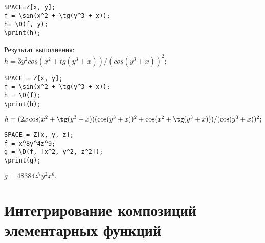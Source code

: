 \vspace*{-3mm}%
\begin{verbatim}
SPACE=Z[x, y];
f = \sin(x^2 + \tg(y^3 + x));
h= \D(f, y);
\print(h);
\end{verbatim}
\vspace*{-3mm}

 Результат выполнения:\\
{$h = 3y^2 cos(x^2+tg(y^3+x))/(cos(y^3+x))^2;$}

\begin{verbatim}
SPACE = Z[x, y];
f = \sin(x^2 + \tg(y^3 + x));
h = \D(f);
\print(h);
\end{verbatim}
\vspace*{-3mm}

{$ h = (2x\cos(x^2+\tg(y^3+x))(\cos(y^3+x))^2+\cos(x^2+\tg(y^3+x)))/(\cos(y^3+x))^2;$}

\begin{verbatim}
SPACE = Z[x, y, z];
f = x^8y^4z^9;
g = \D(f, [x^2, y^2, z^2]);
\print(g);
\end{verbatim}
\vspace*{-3mm}

{$g = 48384z^{7}y^{2}x^{6}. $ }

\section{Интегрирование композиций элементарных функций}

